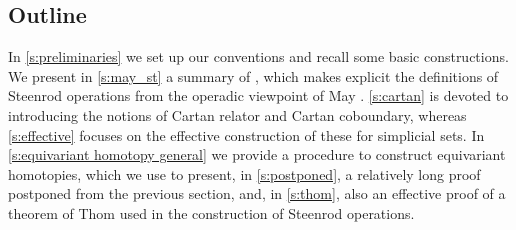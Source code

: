 
\subsection*{Outline}

In \cref{s:preliminaries} we set up our conventions and recall some basic constructions.
We present in \cref{s:may_st} a summary of \cite{medina2021may_st}, which makes explicit the definitions of Steenrod operations \cite{steenrod1953cyclic} from the operadic viewpoint of May \cite{may1970general}.
\cref{s:cartan} is devoted to introducing the notions of Cartan relator and Cartan coboundary, whereas \cref{s:effective} focuses on the effective construction of these for simplicial sets.
In \cref{s:equivariant homotopy general} we provide a procedure to construct equivariant homotopies, which we use to present, in \cref{s:postponed}, a relatively long proof postponed from the previous section, and, in \cref{s:thom}, also an effective proof of a theorem of Thom used in the construction of Steenrod operations.